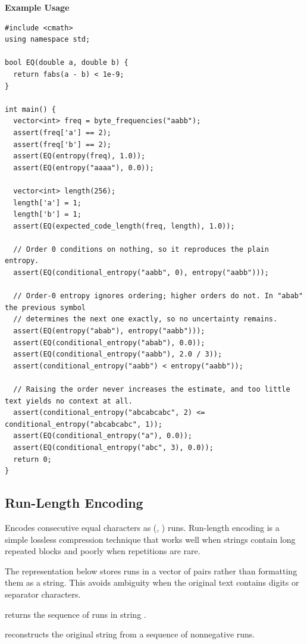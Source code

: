 \textbf{Example Usage}\par
\begin{lstlisting}[style=cpp]
#include <cmath>
using namespace std;

bool EQ(double a, double b) {
  return fabs(a - b) < 1e-9;
}

int main() {
  vector<int> freq = byte_frequencies("aabb");
  assert(freq['a'] == 2);
  assert(freq['b'] == 2);
  assert(EQ(entropy(freq), 1.0));
  assert(EQ(entropy("aaaa"), 0.0));

  vector<int> length(256);
  length['a'] = 1;
  length['b'] = 1;
  assert(EQ(expected_code_length(freq, length), 1.0));

  // Order 0 conditions on nothing, so it reproduces the plain entropy.
  assert(EQ(conditional_entropy("aabb", 0), entropy("aabb")));

  // Order-0 entropy ignores ordering; higher orders do not. In "abab" the previous symbol
  // determines the next one exactly, so no uncertainty remains.
  assert(EQ(entropy("abab"), entropy("aabb")));
  assert(EQ(conditional_entropy("abab"), 0.0));
  assert(EQ(conditional_entropy("aabb"), 2.0 / 3));
  assert(conditional_entropy("aabb") < entropy("aabb"));

  // Raising the order never increases the estimate, and too little text yields no context at all.
  assert(conditional_entropy("abcabcabc", 2) <= conditional_entropy("abcabcabc", 1));
  assert(EQ(conditional_entropy("a"), 0.0));
  assert(EQ(conditional_entropy("abc", 3), 0.0));
  return 0;
}
\end{lstlisting}
\subsection{Run-Length Encoding}
\label{sec:3.8.2}
Encodes consecutive equal characters as (, ) runs. Run-length encoding is a simple lossless compression technique that works well when strings contain long repeated blocks and poorly when repetitions are rare.

The representation below stores runs in a vector of pairs rather than formatting them as a string. This avoids ambiguity when the original text contains digits or separator characters.

\begin{compactitem}
  \item {} returns the sequence of runs in string .
  \item {} reconstructs the original string from a sequence of nonnegative runs.
\end{compactitem}

